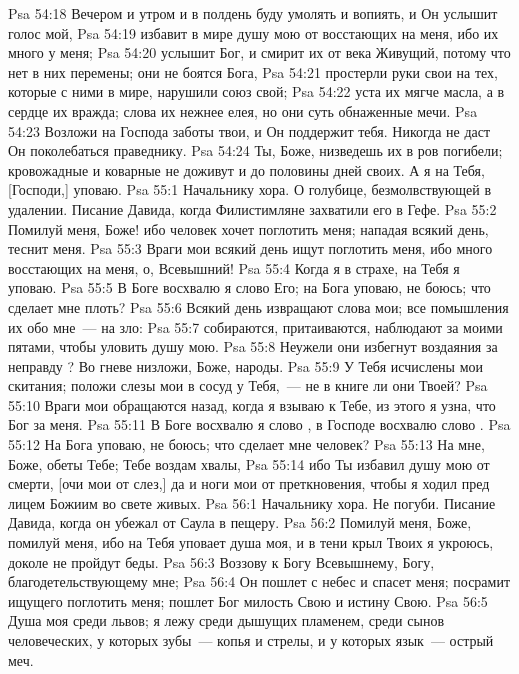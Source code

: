 \vs Psa 54:18 Вечером и утром и в полдень буду умолять и вопиять, и Он услышит голос мой,
\vs Psa 54:19 избавит в мире душу мою от восстающих на меня, ибо их много у меня;
\vs Psa 54:20 услышит Бог, и смирит их от века Живущий, потому что нет в них перемены; они не боятся Бога,
\vs Psa 54:21 простерли руки свои на тех, которые с ними в мире, нарушили союз свой;
\vs Psa 54:22 уста их мягче масла, а в сердце их вражда; слова их нежнее елея, но они суть обнаженные мечи.
\vs Psa 54:23 Возложи на Господа заботы твои, и Он поддержит тебя. Никогда не даст Он поколебаться праведнику.
\vs Psa 54:24 Ты, Боже, низведешь их в ров погибели; кровожадные и коварные не доживут и до половины дней своих. А я на Тебя, [Господи,] уповаю.
\vs Psa 55:1 Начальнику хора. О голубице, безмолвствующей в удалении. Писание Давида, когда Филистимляне захватили его в Гефе.
\rsbpar\vs Psa 55:2 Помилуй меня, Боже! ибо человек хочет поглотить меня; нападая всякий день, теснит меня.
\vs Psa 55:3 Враги мои всякий день ищут поглотить меня, ибо много восстающих на меня, о, Всевышний!
\vs Psa 55:4 Когда я в страхе, на Тебя я уповаю.
\vs Psa 55:5 В Боге восхвалю я слово Его; на Бога уповаю, не боюсь; что сделает мне плоть?
\vs Psa 55:6 Всякий день извращают слова мои; все помышления их обо мне~--- на зло:
\vs Psa 55:7 собираются, притаиваются, наблюдают за моими пятами, чтобы уловить душу мою.
\vs Psa 55:8 Неужели они избегнут воздаяния за неправду ? Во гневе низложи, Боже, народы.
\vs Psa 55:9 У Тебя исчислены мои скитания; положи слезы мои в сосуд у Тебя,~--- не в книге ли они Твоей?
\vs Psa 55:10 Враги мои обращаются назад, когда я взываю к Тебе, из этого я узна, что Бог за меня.
\vs Psa 55:11 В Боге восхвалю я слово , в Господе восхвалю слово .
\vs Psa 55:12 На Бога уповаю, не боюсь; что сделает мне человек?
\vs Psa 55:13 На мне, Боже, обеты Тебе; Тебе воздам хвалы,
\vs Psa 55:14 ибо Ты избавил душу мою от смерти, [очи мои от слез,] да и ноги мои от преткновения, чтобы я ходил пред лицем Божиим во свете живых.
\vs Psa 56:1 Начальнику хора. Не погуби. Писание Давида, когда он убежал от Саула в пещеру.
\rsbpar\vs Psa 56:2 Помилуй меня, Боже, помилуй меня, ибо на Тебя уповает душа моя, и в тени крыл Твоих я укроюсь, доколе не пройдут беды.
\vs Psa 56:3 Воззову к Богу Всевышнему, Богу, благодетельствующему мне;
\vs Psa 56:4 Он пошлет с небес и спасет меня; посрамит ищущего поглотить меня; пошлет Бог милость Свою и истину Свою.
\vs Psa 56:5 Душа моя среди львов; я лежу среди дышущих пламенем, среди сынов человеческих, у которых зубы~--- копья и стрелы, и у которых язык~--- острый меч.
